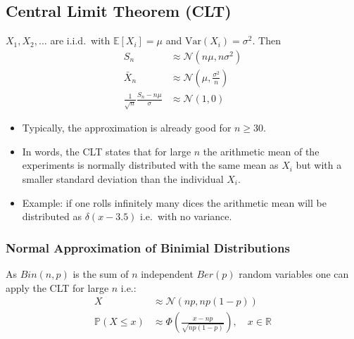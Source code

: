 \subsection{Central Limit Theorem (CLT)}
$X_1, X_2, \ldots$ are i.i.d.\ with $\mathbb{E}[X_i]=\mu$ and $\mathrm{Var}(X_i)=\sigma^2$. Then
\begin{align*}
    S_n                                       & \approx \mathcal{N}(n\mu, n\sigma^2)         \\
    \bar{X}_n                                 & \approx \mathcal{N}(\mu, \frac{\sigma^2}{n}) \\
    \frac{1}{\sqrt{n}}\frac{S_n-n\mu}{\sigma} & \approx\mathcal{N}(1,0)
\end{align*}


\begin{itemize}
    \item Typically, the approximation is already good for $n \geq 30$.
    \item In words, the CLT states that for large $n$ the arithmetic mean of the experiments is normally distributed with the same mean as $X_i$ but with a smaller standard deviation than the individual $X_i$.
    \item Example: if one rolls infinitely many dices the arithmetic mean will be distributed as $\delta(x-3.5)$ i.e.\ with no variance.
\end{itemize}
\subsubsection{Normal Approximation of Binimial Distributions}
As $Bin(n,p)$ is the sum of $n$ independent $Ber(p)$ random variables one can apply the CLT for large $n$ i.e.:
\begin{align*}
    X                   & \approx\mathcal{N}(np,np(1-p))                                           \\
    \mathbb{P}(X\leq x) & \approx\Phi\left(\frac{x-np}{\sqrt{np(1-p)}}\right),\quad x\in\mathbb{R}
\end{align*}